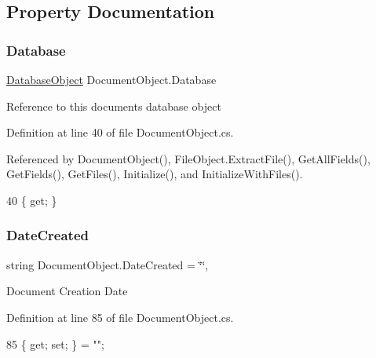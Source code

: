 \subsection{Property Documentation}
\mbox{\label{class_document_object_a69d5338c9835f748490323d2950eed09}} 
\subsubsection{\texorpdfstring{Database}{Database}}
{\footnotesize\ttfamily \mbox{\hyperlink{class_database_object}{Database\+Object}} Document\+Object.\+Database\hspace{0.3cm}{\ttfamily [get]}}



Reference to this documents database object 



Definition at line 40 of file Document\+Object.\+cs.



Referenced by Document\+Object(), File\+Object.\+Extract\+File(), Get\+All\+Fields(), Get\+Fields(), Get\+Files(), Initialize(), and Initialize\+With\+Files().


\begin{DoxyCode}
40 \{ \textcolor{keyword}{get}; \}
\end{DoxyCode}
\mbox{\label{class_document_object_a819cb8baad094f6e5990c54ec1eee8b0}} 
\subsubsection{\texorpdfstring{Date\+Created}{DateCreated}}
{\footnotesize\ttfamily string Document\+Object.\+Date\+Created = \char`\"{}\char`\"{}\hspace{0.3cm}{\ttfamily [get]}, {\ttfamily [set]}}



Document Creation Date 



Definition at line 85 of file Document\+Object.\+cs.


\begin{DoxyCode}
85 \{ \textcolor{keyword}{get}; \textcolor{keyword}{set}; \} = \textcolor{stringliteral}{""};
\end{DoxyCode}
\mbox{\label{class_document_object_a87ba1b3ac1b74b104972c25b245c504b}} 
